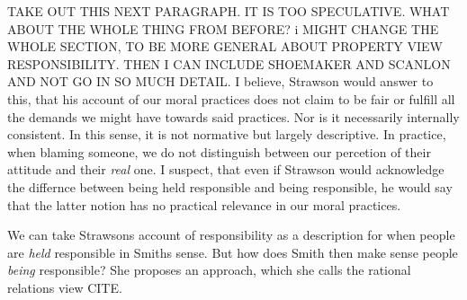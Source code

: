 \documentclass{article}
\begin{document}
%
%

 TAKE OUT THIS NEXT PARAGRAPH. IT  IS TOO SPECULATIVE. WHAT ABOUT THE WHOLE
 THING FROM BEFORE? i MIGHT CHANGE THE WHOLE SECTION, TO BE MORE GENERAL ABOUT
 PROPERTY VIEW RESPONSIBILITY. THEN I CAN INCLUDE SHOEMAKER AND SCANLON AND NOT
 GO IN SO MUCH DETAIL.
 I believe, Strawson would answer to this, that his account of our moral practices
 does not claim to be fair or fulfill all the demands we might have towards said
 practices. Nor is it necessarily internally consistent. In this sense, it is
 not normative but largely descriptive. In practice, when blaming someone, we do
 not distinguish between our percetion of their attitude and their \textit{real}
 one. I suspect, that even if Strawson would acknowledge the differnce
 between being held responsible and being responsible, he would say that the
 latter notion has no practical relevance in our moral practices.

 We can take Strawsons account of responsibility as a description for when
 people are \textit{held} responsible in Smiths sense. But how does Smith then
 make sense people \textit{being} responsible? She proposes an approach, which
 she calls the rational relations view CITE.
\end{document}
